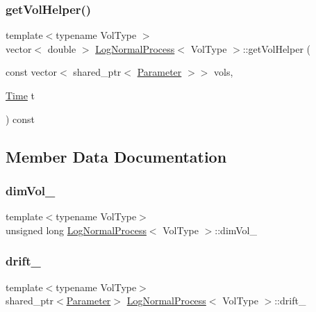 \subsubsection{\texorpdfstring{get\+Vol\+Helper()}{getVolHelper()}\hspace{0.1cm}{\footnotesize\ttfamily [2/2]}}
{\footnotesize\ttfamily template$<$typename Vol\+Type $>$ \\
vector$<$ double $>$ \hyperlink{class_log_normal_process}{Log\+Normal\+Process}$<$ Vol\+Type $>$\+::get\+Vol\+Helper (\begin{DoxyParamCaption}\item[{const vector$<$ shared\+\_\+ptr$<$ \hyperlink{class_parameter}{Parameter} $>$$>$}]{vols,  }\item[{\hyperlink{_name_def_8h_ac2d3e0ba793497bcca555c7c2cf64ff3}{Time}}]{t }\end{DoxyParamCaption}) const\hspace{0.3cm}{\ttfamily [protected]}}



\subsection{Member Data Documentation}
\hypertarget{class_log_normal_process_ae126cc386f39576fa62debd75443fa08}{}\label{class_log_normal_process_ae126cc386f39576fa62debd75443fa08} 
\subsubsection{\texorpdfstring{dim\+Vol\+\_\+}{dimVol\_}}
{\footnotesize\ttfamily template$<$typename Vol\+Type$>$ \\
unsigned long \hyperlink{class_log_normal_process}{Log\+Normal\+Process}$<$ Vol\+Type $>$\+::dim\+Vol\+\_\+\hspace{0.3cm}{\ttfamily [protected]}}

\hypertarget{class_log_normal_process_ae59abec9b1917c092665a99464f4af85}{}\label{class_log_normal_process_ae59abec9b1917c092665a99464f4af85} 
\subsubsection{\texorpdfstring{drift\+\_\+}{drift\_}}
{\footnotesize\ttfamily template$<$typename Vol\+Type$>$ \\
shared\+\_\+ptr$<$\hyperlink{class_parameter}{Parameter}$>$ \hyperlink{class_log_normal_process}{Log\+Normal\+Process}$<$ Vol\+Type $>$\+::drift\+\_\+\hspace{0.3cm}{\ttfamily [protected]}}

